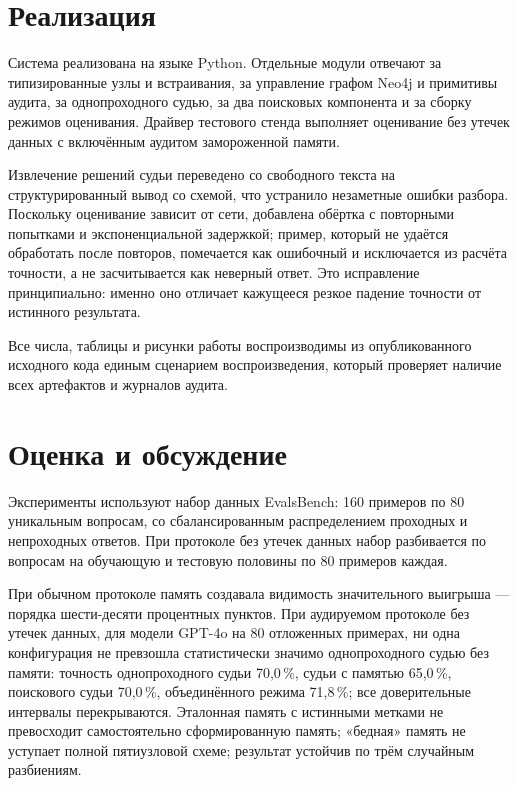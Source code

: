 \documentclass[14pt,a4paper]{extreport}
\begin{document}
\chapter{Реализация}

Система реализована на языке Python. Отдельные модули отвечают за типизированные узлы и встраивания, за управление графом Neo4j и примитивы аудита, за однопроходного судью, за два поисковых компонента и за сборку режимов оценивания. Драйвер тестового стенда выполняет оценивание без утечек данных с включённым аудитом замороженной памяти.

Извлечение решений судьи переведено со свободного текста на структурированный вывод со схемой, что устранило незаметные ошибки разбора. Поскольку оценивание зависит от сети, добавлена обёртка с повторными попытками и экспоненциальной задержкой; пример, который не удаётся обработать после повторов, помечается как ошибочный и исключается из расчёта точности, а не засчитывается как неверный ответ. Это исправление принципиально: именно оно отличает кажущееся резкое падение точности от истинного результата.

Все числа, таблицы и рисунки работы воспроизводимы из опубликованного исходного кода единым сценарием воспроизведения, который проверяет наличие всех артефактов и журналов аудита.

\chapter{Оценка и обсуждение}

Эксперименты используют набор данных EvalsBench: 160 примеров по 80 уникальным вопросам, со сбалансированным распределением проходных и непроходных ответов. При протоколе без утечек данных набор разбивается по вопросам на обучающую и тестовую половины по 80 примеров каждая.

При обычном протоколе память создавала видимость значительного выигрыша — порядка шести-десяти процентных пунктов. При аудируемом протоколе без утечек данных, для модели GPT-4o на 80 отложенных примерах, ни одна конфигурация не превзошла статистически значимо однопроходного судью без памяти: точность однопроходного судьи 70,0\,\%, судьи с памятью 65,0\,\%, поискового судьи 70,0\,\%, объединённого режима 71,8\,\%; все доверительные интервалы перекрываются. Эталонная память с истинными метками не превосходит самостоятельно сформированную память; «бедная» память не уступает полной пятиузловой схеме; результат устойчив по трём случайным разбиениям.
\end{document}
